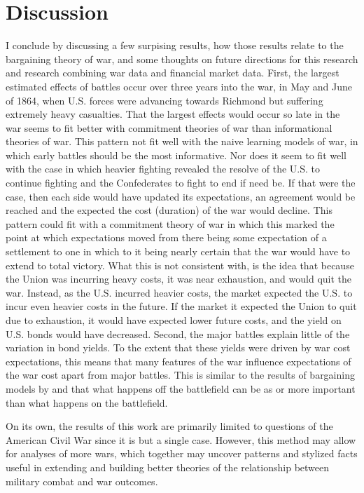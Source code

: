 \section{Discussion}
\label{sec:conclusion}

I conclude by discussing a few surpising results, how those results relate to the bargaining theory of war, and some thoughts on future directions for this research and research combining war data and financial market data.
First, the largest estimated effects of battles occur over three years into the war, in May and June of 1864, when U.S. forces were advancing towards Richmond but suffering extremely heavy casualties.
That the largest effects would occur so late in the war seems to fit better with commitment theories of war than informational theories of war.
This pattern not fit well with the naive learning models of war, in which early battles should be the most informative.
Nor does it seem to fit well with the case in which heavier fighting revealed the resolve of the U.S. to continue fighting and the Confederates to fight to end if need be.
If that were the case, then each side would have updated its expectations, an agreement would be reached and the expected the cost (duration) of the war would decline.
This pattern could fit with a commitment theory of war in which this marked the point at which expectations moved from there being some expectation of a settlement to one in which to it being nearly certain that the war would have to extend to total victory.
What this is not consistent with, is the idea that because the Union was incurring heavy costs, it was near exhaustion, and would quit the war.
Instead, as the U.S. incurred heavier costs, the market expected the U.S. to incur even heavier costs in the future.
If the market it expected the Union to quit due to exhaustion, it would have expected lower future costs, and the yield on U.S. bonds would have decreased.
Second, the major battles explain little of the variation in bond yields.
To the extent that these yields were driven by war cost expectations, this means that many features of the war influence expectations of the war cost apart from major battles.
This is similar to the results of bargaining models by \textcite{Powell2004} and \textcite{Slantchev2003} that what happens off the battlefield can be as or more important than what happens on the battlefield.

On its own, the results of this work are primarily limited to questions of the American Civil War since it is but a single case.
However, this method may allow for analyses of more wars, which together may uncover patterns and stylized facts useful in extending and building better theories of the relationship between military combat and war outcomes.


